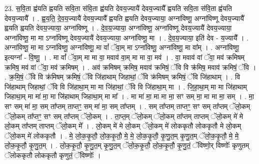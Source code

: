 \documentclass[17pt]{extarticle}
\begin{document}
23. स॒वि॒ता ह्व॑यति ह्वयति सवि॒ता स॑वि॒ता ह्व॑यति देवय॒ज्यायै॑ देवय॒ज्यायै᳚ ह्वयति सवि॒ता स॑वि॒ता ह्व॑यति देवय॒ज्यायै᳚ । . ह्व॒य॒ति॒ दे॒व॒य॒ज्यायै॑ देवय॒ज्यायै᳚ ह्वयति ह्वयति देवय॒ज्याया॒ अग्ना॑विष्णू॒ अग्ना॑विष्णू देवय॒ज्यायै᳚ ह्वयति ह्वयति देवय॒ज्याया॒ अग्ना॑विष्णू । . दे॒व॒य॒ज्याया॒ अग्ना॑विष्णू॒ अग्ना॑विष्णू देवय॒ज्यायै॑ देवय॒ज्याया॒ अग्ना॑विष्णू॒ मा मा ऽग्ना॑विष्णू देवय॒ज्यायै॑ देवय॒ज्याया॒ अग्ना॑विष्णू॒ मा । . दे॒व॒य॒ज्याया॒ इति॑ देव - य॒ज्यायै᳚ । . अग्ना॑विष्णू॒ मा मा ऽग्ना॑विष्णू॒ अग्ना॑विष्णू॒ मा वां᳚ ॅवा॒म् मा ऽग्ना॑विष्णू॒ अग्ना॑विष्णू॒ मा वा᳚म् । . अग्ना॑विष्णू॒ इत्यग्ना᳚ - वि॒ष्णू॒ । . मा वां᳚ ॅवा॒म् मा मा वा॒ मवाव॑ वा॒म् मा मा वा॒ मव॑ । . वा॒ मवाव॑ वां ॅवा॒ मव॑ क्रमिषम् क्रमिष॒ मव॑ वां ॅवा॒ मव॑ क्रमिषम् । . अव॑ क्रमिषम् क्रमिष॒ मवाव॑ क्रमिषं॒ ॅवि वि क्र॑मिष॒ मवाव॑ क्रमिषं॒ ॅवि । . क्र॒मि॒षं॒ ॅवि वि क्र॑मिषम् क्रमिषं॒ ॅवि जि॑हाथाम् जिहाथां॒ ॅवि क्र॑मिषम् क्रमिषं॒ ॅवि जि॑हाथाम् । . वि जि॑हाथाम् जिहाथां॒ ॅवि वि जि॑हाथा॒म् मा मा जि॑हाथां॒ ॅवि वि जि॑हाथा॒म् मा । . जि॒हा॒था॒म् मा मा जि॑हाथाम् जिहाथा॒म् मा मा॑ मा॒ मा जि॑हाथाम् जिहाथा॒म् मा मा᳚ । . मा मा॑ मा॒ मा मा मा॒ सꣳ सम् मा॒ मा मा मा॒ सम् । . मा॒ सꣳ सम् मा॑ मा॒ सम् ता᳚प्तम् ताप्तꣳ॒॒ सम् मा॑ मा॒ सम् ता᳚प्तम् । . सम् ता᳚प्तम् ताप्तꣳ॒॒ सꣳ सम् ता᳚प्तम् ॅलो॒कम् ॅलो॒कम् ता᳚प्तꣳ॒॒ सꣳ सम् ता᳚प्तम् ॅलो॒कम् । . ता॒प्त॒म् ॅलो॒कम् ॅलो॒कम् ता᳚प्तम् ताप्तम् ॅलो॒कम् मे॑ मे लो॒कम् ता᳚प्तम् ताप्तम् ॅलो॒कम् मे᳚ । . लो॒कम् मे॑ मे लो॒कम् ॅलो॒कम् मे॑ लोककृतौ लोककृतौ मे लो॒कम् ॅलो॒कम् मे॑ लोककृतौ । . मे॒ लो॒क॒कृ॒तौ॒ लो॒क॒कृ॒तौ॒ मे॒ मे॒ लो॒क॒कृ॒तौ॒ कृ॒णु॒त॒म् कृ॒णु॒त॒म् ॅलो॒क॒कृ॒तौ॒ मे॒ मे॒ लो॒क॒कृ॒तौ॒ कृ॒णु॒त॒म् । . लो॒क॒कृ॒तौ॒ कृ॒णु॒त॒म् कृ॒णु॒त॒म् ॅलो॒क॒कृ॒तौ॒ लो॒क॒कृ॒तौ॒ कृ॒णु॒तं॒ ॅविष्णो॒र् विष्णोः᳚ कृणुतम् ॅलोककृतौ लोककृतौ कृणुतं॒ ॅविष्णोः᳚ । \newline
\end{document}
